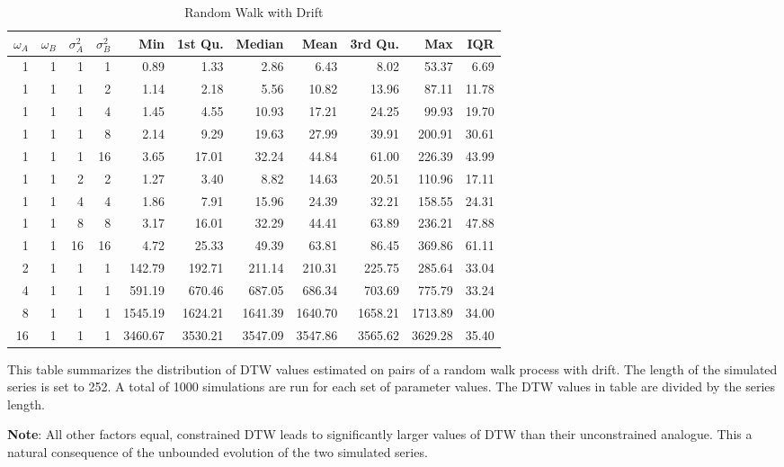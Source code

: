 \documentclass[12pt]{article}
\begin{document}
\begin{table}[!ht]
\begin{center}
\begin{tabular}{r r r r | r r r r r r r}
        \midrule
        $\omega_{A}$ & $\omega_{B}$ & $\sigma^{2}_{A}$ & $\sigma^{2}_{B}$ & Min & 1st Qu. & Median & Mean & 3rd Qu. & Max & IQR \\
        \midrule
        1  & 1 & 1  & 1  &    0.89 &    1.33 &    2.86 &    6.43 &    8.02 &   53.37 &  6.69 \\
        \midrule
        1  & 1 & 1  & 2  &    1.14 &    2.18 &    5.56 &   10.82 &   13.96 &   87.11 & 11.78 \\
        1  & 1 & 1  & 4  &    1.45 &    4.55 &   10.93 &   17.21 &   24.25 &   99.93 & 19.70 \\
        1  & 1 & 1  & 8  &    2.14 &    9.29 &   19.63 &   27.99 &   39.91 &  200.91 & 30.61 \\
        1  & 1 & 1  & 16 &    3.65 &   17.01 &   32.24 &   44.84 &   61.00 &  226.39 & 43.99 \\
        \midrule
        1  & 1 & 2  & 2  &    1.27 &    3.40 &    8.82 &   14.63 &   20.51 &  110.96 & 17.11 \\
        1  & 1 & 4  & 4  &    1.86 &    7.91 &   15.96 &   24.39 &   32.21 &  158.55 & 24.31 \\
        1  & 1 & 8  & 8  &    3.17 &   16.01 &   32.29 &   44.41 &   63.89 &  236.21 & 47.88 \\
        1  & 1 & 16 & 16 &    4.72 &   25.33 &   49.39 &   63.81 &   86.45 &  369.86 & 61.11 \\
        \midrule
        2  & 1 & 1  & 1  &  142.79 &  192.71 &  211.14 &  210.31 &  225.75 &  285.64 & 33.04 \\
        4  & 1 & 1  & 1  &  591.19 &  670.46 &  687.05 &  686.34 &  703.69 &  775.79 & 33.24 \\
        8  & 1 & 1  & 1  & 1545.19 & 1624.21 & 1641.39 & 1640.70 & 1658.21 & 1713.89 & 34.00 \\
        16 & 1 & 1  & 1  & 3460.67 & 3530.21 & 3547.09 & 3547.86 & 3565.62 & 3629.28 & 35.40 \\
        \hline
      \end{tabular}
    \caption{Random Walk with Drift} \label{tbl:dtw_random_walk_with_drift}
    \end{center}
    \begin{tablenotes}
        \item{\footnotesize This table summarizes the distribution of DTW values estimated on pairs of a random walk process with drift. The length of the simulated series is set to 252. A total of 1000 simulations are run for each set of parameter values. The DTW values in table are divided by the series length.}
        \item {\footnotesize \textbf{Note}: All other factors equal, constrained DTW leads to significantly larger values of DTW than their unconstrained analogue. This a natural consequence of the unbounded evolution of the two simulated series.}
    \end{tablenotes}
\end{table}
\end{document}

